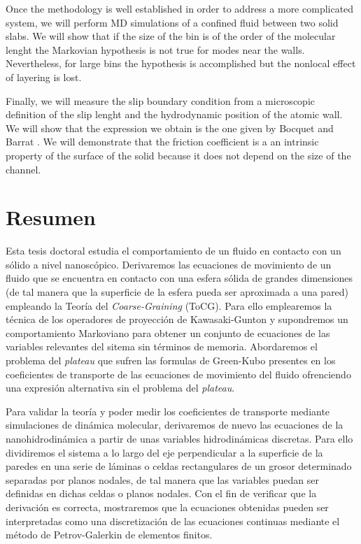 \documentclass[b5paper,openright,10pt]{book}
\begin{document}
Once the methodology is well established in order to address a more complicated system, we will perform MD simulations of a confined fluid between two solid slabs. We will show that if the size of the bin is of the order of the molecular lenght the Markovian hypothesis is not true for modes near the walls. Nevertheless, for large bins the hypothesis is accomplished but the nonlocal effect of layering is lost. 

Finally, we will measure the slip boundary condition from a microscopic definition of the slip lenght and the hydrodynamic position of the atomic wall. We will show that the expression we obtain is the one given by Bocquet and Barrat \cite{Bocquet1994}. We will demonstrate that the friction coefficient is a an intrinsic property of the surface of the solid because it does not depend on the size of the channel. 

\chapter*{Resumen} %
Esta tesis doctoral estudia el comportamiento de un fluido en contacto con un sólido a nivel nanoscópico. Derivaremos las ecuaciones de movimiento de un fluido que se encuentra en contacto con una esfera sólida de grandes dimensiones (de tal manera que la superficie de la esfera pueda ser aproximada a una pared) empleando la Teoría del \textit{Coarse-Graining} (ToCG). Para ello emplearemos la técnica de los operadores de proyección de Kawasaki-Gunton y supondremos un comportamiento Markoviano para obtener un conjunto de ecuaciones de las variables relevantes del sitema sin términos de memoria. 
Abordaremos el problema del \textit{plateau} que sufren las formulas de Green-Kubo presentes en los coeficientes de transporte de las ecuaciones de movimiento del fluido ofrenciendo una expresión alternativa sin el problema del \textit{plateau}.  

Para validar la teoría y poder medir los coeficientes de transporte mediante simulaciones de dinámica molecular, derivaremos de nuevo las ecuaciones de la nanohidrodinámica a partir de unas variables hidrodinámicas discretas. 
Para ello dividiremos el sistema a lo largo del eje perpendicular a la superficie de la paredes en una serie de láminas o celdas rectangulares de un grosor determinado separadas por planos nodales, de tal manera que las variables puedan ser definidas en dichas celdas o planos nodales.  
Con el fin de verificar que la derivación es correcta, mostraremos que la ecuaciones obtenidas pueden ser interpretadas como una discretización de las ecuaciones continuas mediante el método de Petrov-Galerkin de elementos finitos.  
\end{document}
